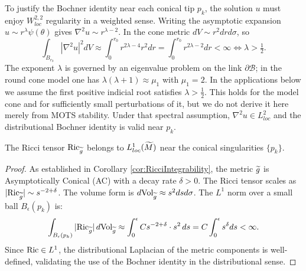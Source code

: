 \begin{lemma}
To justify the Bochner identity near each conical tip $p_k$, the solution $u$ must enjoy $W^{2,2}_{loc}$ regularity in a weighted sense. Writing the asymptotic expansion $u \sim r^\lambda \psi(\theta)$ gives $\nabla^2 u \sim r^{\lambda-2}$. In the cone metric $dV \sim r^2 dr d\sigma$, so
\[ \int_{B_{r_0}} |\nabla^2 u|^2 dV \approx \int_0^{r_0} r^{2\lambda-4} r^2 dr = \int_0^{r_0} r^{2\lambda - 2} dr < \infty \iff \lambda > \tfrac{1}{2}. \]
The exponent $\lambda$ is governed by an eigenvalue problem on the link $\partial \mathcal{B}$; in the round cone model one has $\lambda(\lambda+1)\approx \mu_1$ with $\mu_1=2$. In the applications below we assume the first positive indicial root satisfies $\lambda>\tfrac12$. This holds for the model cone and for sufficiently small perturbations of it, but we do not derive it here merely from MOTS stability. Under that spectral assumption, $\nabla^2 u \in L^2_{loc}$ and the distributional Bochner identity is valid near $p_k$.
\end{lemma}

\begin{lemma}
\label{lem:RicciIntegrability}
The Ricci tensor $\mathrm{Ric}_{\widetilde{g}}$ belongs to $L^1_{loc}(\widetilde{M})$ near the conical singularities $\{p_k\}$.
\end{lemma}

\begin{proof}
As established in Corollary \ref{cor:RicciIntegrability}, the metric $\widetilde{g}$ is Asymptotically Conical (AC) with a decay rate $\delta>0$. The Ricci tensor scales as $|\mathrm{Ric}_{\widetilde{g}}| \sim s^{-2+\delta}$. The volume form is $d\text{Vol}_{\widetilde{g}} \approx s^2 ds d\sigma$.
The $L^1$ norm over a small ball $B_\epsilon(p_k)$ is:
\[ \int_{B_\epsilon(p_k)} |\mathrm{Ric}_{\widetilde{g}}| \, d\text{Vol}_{\widetilde{g}} \approx \int_0^\epsilon C s^{-2+\delta} \cdot s^2 \, ds = C \int_0^\epsilon s^\delta ds < \infty. \]
Since $\mathrm{Ric} \in L^1$, the distributional Laplacian of the metric components is well-defined, validating the use of the Bochner identity in the distributional sense.
\end{proof}

